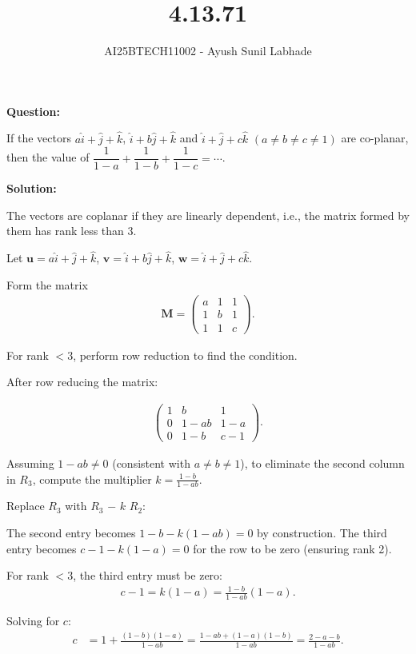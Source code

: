 \documentclass{beamer}
\theoremstyle{remark}
\newcommand{\myvec}[1]{\ensuremath{\begin{pmatrix}#1\end{pmatrix}}}
\let\vec\mathbf
\numberwithin{equation}{section}
\begin{document}
\title{4.13.71}
\author{AI25BTECH11002 - Ayush Sunil Labhade}
{\let\newpage\relax\maketitle}


\textbf{Question:}

If the vectors \(a \hat{i} + \hat{j} + \hat{k}\), \(\hat{i} + b \hat{j} + \hat{k}\) and \(\hat{i} + \hat{j} + c \hat{k}\) \((a \neq b \neq c \neq 1)\) are co-planar, then
the value of \(\dfrac{1}{1-a} + \dfrac{1}{1-b} + \dfrac{1}{1-c} = \dotsb\).

\textbf{Solution:}

The vectors are coplanar if they are linearly dependent, i.e., the matrix formed by them has rank less than 3.

Let \(\vec{u} = a \hat{i} + \hat{j} + \hat{k}\), \(\vec{v} = \hat{i} + b \hat{j} + \hat{k}\), \(\vec{w} = \hat{i} + \hat{j} + c \hat{k}\).

Form the matrix
\begin{align}
	\vec{M} = \myvec{a & 1 & 1 \\ 1 & b & 1 \\ 1 & 1 & c}.
\end{align}

For rank $<3$, perform row reduction to find the condition.

After row reducing the matrix:

\begin{align}
\myvec{1 & b & 1 \\ 0 & 1 - ab & 1 - a \\ 0 & 1 - b & c - 1}.
\end{align}

Assuming \(1 - ab \neq 0\) (consistent with \(a \neq b \neq 1\)), to eliminate the second column in $R_3$, compute the multiplier \(k = \frac{1 - b}{1 - ab}\).

Replace $R_3$ with $R_3$ $-$ \(k\) $R_2$:

The second entry becomes \(1 - b - k (1 - ab) = 0\) by construction.
The third entry becomes \(c - 1 - k (1 - a) = 0\) for the row to be zero (ensuring rank 2).

For rank $<3$, the third entry must be zero:
\begin{align}
c - 1 = k (1 - a) = \frac{1 - b}{1 - ab} (1 - a).
\end{align}

Solving for \(c\):
\begin{align}
c &= 1 + \frac{(1 - b)(1 - a)}{1 - ab} = \frac{1 - ab + (1 - a)(1 - b)}{1 - ab} = \frac{2 - a - b}{1 - ab}.
\end{align}
\end{document}
